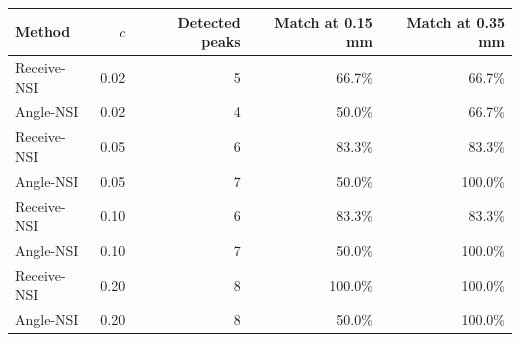 \begin{tabular}{@{}lrrrr@{}}
\toprule
Method & $c$ & Detected peaks & Match at 0.15 mm & Match at 0.35 mm \\
\midrule
Receive-NSI & 0.02 & 5 & 66.7\% & 66.7\% \\
Angle-NSI & 0.02 & 4 & 50.0\% & 66.7\% \\
Receive-NSI & 0.05 & 6 & 83.3\% & 83.3\% \\
Angle-NSI & 0.05 & 7 & 50.0\% & 100.0\% \\
Receive-NSI & 0.10 & 6 & 83.3\% & 83.3\% \\
Angle-NSI & 0.10 & 7 & 50.0\% & 100.0\% \\
Receive-NSI & 0.20 & 8 & 100.0\% & 100.0\% \\
Angle-NSI & 0.20 & 8 & 50.0\% & 100.0\% \\
\bottomrule
\end{tabular}
